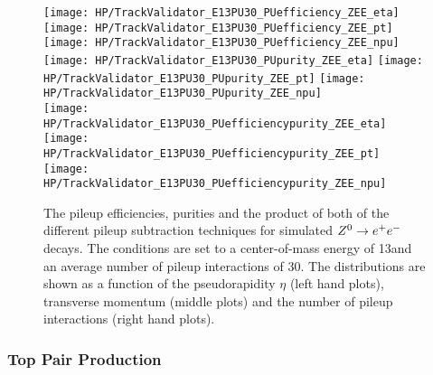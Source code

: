 \begin{figure}[!t]
  \centering
  \texttt{[image: HP/TrackValidator\_E13PU30\_PUefficiency\_ZEE\_eta]}
  \texttt{[image: HP/TrackValidator\_E13PU30\_PUefficiency\_ZEE\_pt]}
  \texttt{[image: HP/TrackValidator\_E13PU30\_PUefficiency\_ZEE\_npu]}
   \\
  \texttt{[image: HP/TrackValidator\_E13PU30\_PUpurity\_ZEE\_eta]}
  \texttt{[image: HP/TrackValidator\_E13PU30\_PUpurity\_ZEE\_pt]}
  \texttt{[image: HP/TrackValidator\_E13PU30\_PUpurity\_ZEE\_npu]}
   \\
  \texttt{[image: HP/TrackValidator\_E13PU30\_PUefficiencypurity\_ZEE\_eta]}
  \texttt{[image: HP/TrackValidator\_E13PU30\_PUefficiencypurity\_ZEE\_pt]}
  \texttt{[image: HP/TrackValidator\_E13PU30\_PUefficiencypurity\_ZEE\_npu]}
  \caption[Pileup efficiencies, purities and their product of the different pileup subtraction techniques based on simulated $\Zz\rightarrow\EE$ decays with 13\TeV and $\left<PU\right>=30$]{The pileup efficiencies, purities and the product of both of the different pileup subtraction techniques for simulated $\Zz\rightarrow\EE$ decays. The conditions are set to a center-of-mass energy of 13\TeV and an average number of pileup interactions of 30. The distributions are shown as a function of the pseudorapidity $\eta$ (left hand plots), transverse momentum (middle plots) and the number of pileup interactions (right hand plots). \label{plot:HPUTAE13PU30ZtoeePUComp}}
\end{figure}

\subsubsection{Top Pair Production \label{sec:HPUTAE13PU30TT}}

